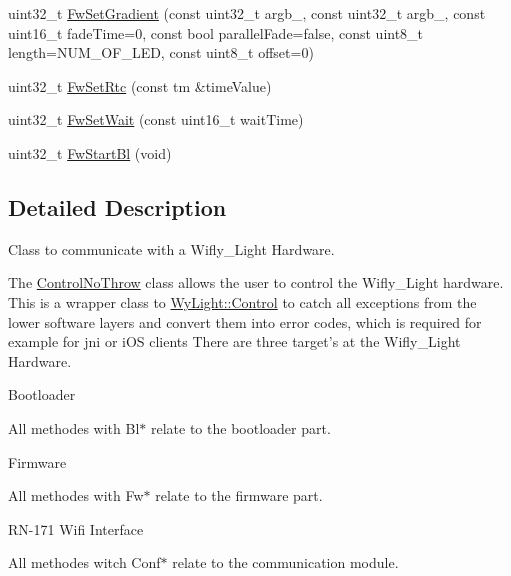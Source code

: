 \begin{DoxyCompactItemize}
\item 
uint32\-\_\-t \hyperlink{class_wy_light_1_1_control_no_throw_a1d50d589698cd976dec870710d1d628a}{Fw\-Set\-Gradient} (const uint32\-\_\-t argb\-\_, const uint32\-\_\-t argb\-\_, const uint16\-\_\-t fade\-Time=0, const bool parallel\-Fade=false, const uint8\-\_\-t length=N\-U\-M\-\_\-\-O\-F\-\_\-\-L\-E\-D, const uint8\-\_\-t offset=0)
\item 
uint32\-\_\-t \hyperlink{class_wy_light_1_1_control_no_throw_a57d493b1081707246bafa7be52f8db49}{Fw\-Set\-Rtc} (const tm \&time\-Value)
\item 
uint32\-\_\-t \hyperlink{class_wy_light_1_1_control_no_throw_a124a9c7b09966ce9f717b1058ab0ac54}{Fw\-Set\-Wait} (const uint16\-\_\-t wait\-Time)
\item 
uint32\-\_\-t \hyperlink{class_wy_light_1_1_control_no_throw_ae94183c86828b1a223c46fec3c04c285}{Fw\-Start\-Bl} (void)
\end{DoxyCompactItemize}


\subsection{Detailed Description}
Class to communicate with a Wifly\-\_\-\-Light Hardware. 

The \hyperlink{class_wy_light_1_1_control_no_throw}{Control\-No\-Throw} class allows the user to control the Wifly\-\_\-\-Light hardware. This is a wrapper class to \hyperlink{class_wy_light_1_1_control}{Wy\-Light\-::\-Control} to catch all exceptions from the lower software layers and convert them into error codes, which is required for example for jni or i\-O\-S clients There are three target's at the Wifly\-\_\-\-Light Hardware.
\begin{DoxyItemize}
\item Bootloader\par
 All methodes with Bl$\ast$ relate to the bootloader part.
\item Firmware\par
 All methodes with Fw$\ast$ relate to the firmware part.
\item R\-N-\/171 Wifi Interface\par
 All methodes witch Conf$\ast$ relate to the communication module. 
\end{DoxyItemize}

